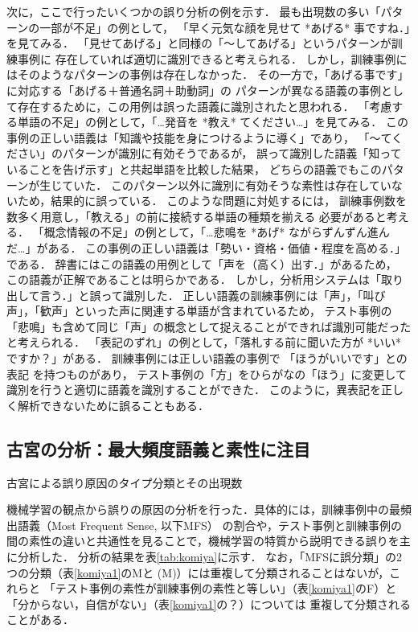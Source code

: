 \documentclass[japanese]{jnlp_1.4}
\begin{document}
次に，ここで行ったいくつかの誤り分析の例を示す．
最も出現数の多い「パターンの一部が不足」の例として，
「早く元気な顔を見せて *あげる* 事ですね．」を見てみる．
「見せてあげる」と同様の「〜してあげる」というパターンが訓練事例に
存在していれば適切に識別できると考えられる．
しかし，訓練事例にはそのようなパターンの事例は存在しなかった．
その一方で，「あげる事です」に対応する「あげる＋普通名詞＋助動詞」の
パターンが異なる語義の事例として存在するために，この用例は誤った語義に識別されたと思われる．
「考慮する単語の不足」の例として，「…発音を *教え* てください…」を見てみる．
この事例の正しい語義は「知識や技能を身につけるように導く」であり，
「〜てください」のパターンが識別に有効そうであるが，
誤って識別した語義「知っていることを告げ示す」と共起単語を比較した結果，
どちらの語義でもこのパターンが生じていた．
このパターン以外に識別に有効そうな素性は存在していないため，結果的に誤っている．
このような問題に対処するには，
訓練事例数を数多く用意し，「教える」の前に接続する単語の種類を揃える
必要があると考える．
「概念情報の不足」の例として，「…悲鳴を *あげ* ながらずんずん進んだ…」がある．
この事例の正しい語義は「勢い・資格・価値・程度を高める．」である．
辞書にはこの語義の用例として「声を（高く）出す．」があるため，
この語義が正解であることは明らかである．
しかし，分析用システムは「取り出して言う．」と誤って識別した．
正しい語義の訓練事例には「声」，「叫び声」，「歓声」といった声に関連する単語が含まれているため，
テスト事例の「悲鳴」も含めて同じ「声」の概念として捉えることができれば識別可能だったと考えられる．
「表記のずれ」の例として，「落札する前に聞いた方が *いい* ですか？」がある．
訓練事例には正しい語義の事例で
「ほうがいいです」との表記
を持つものがあり，
テスト事例の「方」をひらがなの「ほう」に変更して識別を行うと適切に語義を識別することができた．
このように，異表記を正しく解析できないために誤ることもある．


\subsection{古宮の分析：最大頻度語義と素性に注目}

\begin{table}[b]
\caption{古宮による誤り原因のタイプ分類とその出現数}
\label{tab:komiya}\label{komiya1}

\end{table}

機械学習の観点から誤りの原因の分析を行った．具体的には，訓練事例中の最頻出語義（Most Frequent Sense, 以下MFS）
の割合や，テスト事例と訓練事例の間の素性の違いと共通性を見ることで，機械学習の特質から説明できる誤りを主に分析した．
分析の結果を表\ref{tab:komiya}に示す．
なお，「MFSに誤分類」の2つの分類（表\ref{komiya1}のMと (M)）には重複して分類されることはないが，これらと
「テスト事例の素性が訓練事例の素性と等しい」（表\ref{komiya1}のF）と
「分からない，自信がない」（表\ref{komiya1}の？）については
重複して分類されることがある．
\end{document}
